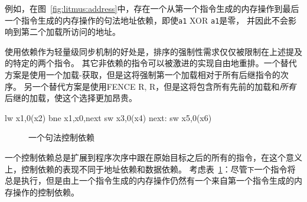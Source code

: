 例如，在图~\ref{fig:litmus:address}中，存在一个从第一个指令生成的内存操作到最后一个指令生成的内存操作的句法地址依赖，即使{\tt a1} XOR {\tt a1}是零，
并因此不会影响到第二个加载所访问的地址。

使用依赖作为轻量级同步机制的好处是，排序的强制性需求仅仅被限制在上述提及的特定的两个指令。
其它非依赖的指令可以被激进的实现自由地重排。一个替代方案是使用一个加载-获取，但是这将强制第一个加载相对于所有后继指令的次序。
另一个替代方案是使用FENCE R, R，但是这将包含所有先前的加载和{\em 所有}后继的加载，使这个选择更加昂贵。

\begin{verbbox}
      lw  x1,0(x2)
      bne x1,x0,next
      sw  x3,0(x4)
next: sw  x5,0(x6)
\end{verbbox}
\begin{figure}[h!]
  \centering\small
  \theverbbox
  \caption{一个句法控制依赖 
  }
  \label{fig:litmus:control1}
\end{figure}

一个控制依赖总是扩展到程序次序中跟在原始目标之后的所有的指令，在这个意义上，控制依赖的表现不同于地址依赖和数据依赖。
考虑表~\ref{fig:litmus:control1}：尽管{\tt 下}一个指令将总是执行，但是由上一个指令生成的内存操作仍然有一个来自第一个指令生成的内存操作的控制依赖。

